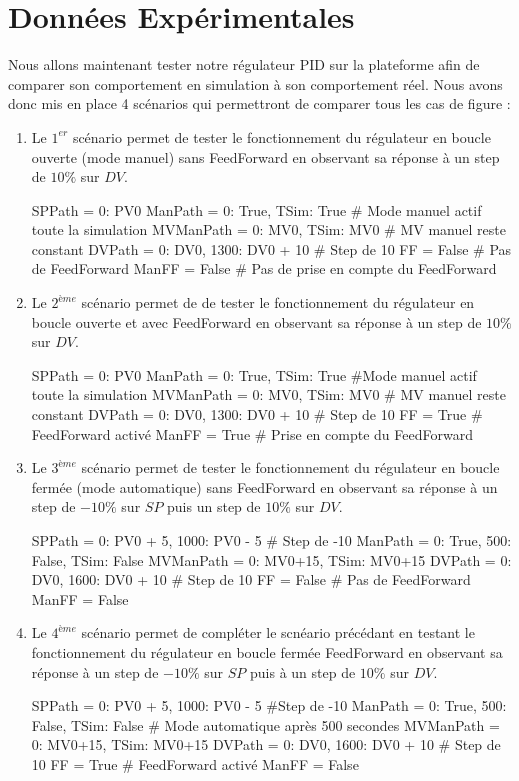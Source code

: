 \section{Données Expérimentales}

Nous allons maintenant tester notre régulateur PID sur la plateforme afin de comparer son comportement en 
simulation à son comportement réel. Nous avons donc mis en place 4 scénarios qui permettront de comparer 
tous les cas de figure : 
\begin{enumerate}
	\item Le $1^{er}$ scénario permet de tester le fonctionnement du régulateur en boucle ouverte (mode manuel) sans FeedForward en observant sa réponse à un step de $10\%$ sur $DV$.
	\begin{python*}
		SPPath = {0: PV0} 
		ManPath = {0: True, TSim: True} # Mode manuel actif toute la simulation
		MVManPath = {0: MV0, TSim: MV0} # MV manuel reste constant
		DVPath = {0: DV0, 1300: DV0 + 10} # Step de 10%
		FF = False # Pas de FeedForward
		ManFF = False # Pas de prise en compte du FeedForward 
	\end{python*}
	\item Le $2^{ème}$ scénario permet de de tester le fonctionnement du régulateur en boucle ouverte et avec FeedForward en observant 
	sa réponse à un step de $10\%$ sur $DV$.
	\begin{python*}
		SPPath = {0: PV0}
		ManPath = {0: True, TSim: True} #Mode manuel actif toute la simulation
		MVManPath = {0: MV0, TSim: MV0} # MV manuel reste constant
		DVPath = {0: DV0, 1300: DV0 + 10} # Step de 10%
		FF = True # FeedForward activé
		ManFF = True # Prise en compte du FeedForward
	\end{python*}
	\item Le $3^{ème}$ scénario permet de tester le fonctionnement du régulateur en boucle fermée (mode automatique) sans FeedForward en observant sa réponse
	à un step de $-10\%$ sur $SP$ puis un step de $10\%$ sur $DV$.
	\begin{python*}
		SPPath = {0: PV0 + 5, 1000: PV0 - 5} # Step de -10%
		ManPath = {0: True, 500: False, TSim: False} 
		MVManPath = {0: MV0+15, TSim: MV0+15}
		DVPath = {0: DV0, 1600: DV0 + 10} # Step de 10%
		FF = False # Pas de FeedForward
		ManFF = False 
	\end{python*}
	\item Le $4^{ème}$ scénario permet de compléter le scnéario précédant en testant le fonctionnement du régulateur en boucle fermée FeedForward en observant sa réponse à un step
	de $-10\%$ sur $SP$ puis à un step de $10\%$ sur $DV$.
	\begin{python*}
		SPPath = {0: PV0 + 5, 1000: PV0 - 5} #Step de -10%
		ManPath = {0: True, 500: False, TSim: False} # Mode automatique après 500 secondes
		MVManPath = {0: MV0+15, TSim: MV0+15} 
		DVPath = {0: DV0, 1600: DV0 + 10} # Step de 10%
		FF = True # FeedForward activé
		ManFF = False 
	\end{python*}
\end{enumerate}

